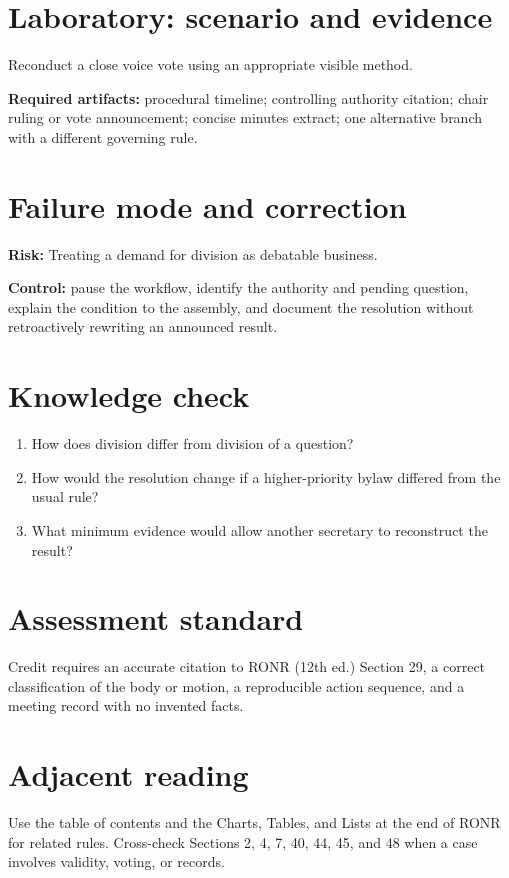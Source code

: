 \documentclass[11pt]{article}
\begin{document}
\section{Laboratory: scenario and evidence}
Reconduct a close voice vote using an appropriate visible method.

\textbf{Required artifacts:} procedural timeline; controlling authority citation; chair ruling or vote announcement; concise minutes extract; one alternative branch with a different governing rule.

\section{Failure mode and correction}
\textbf{Risk:} Treating a demand for division as debatable business.

\textbf{Control:} pause the workflow, identify the authority and pending question, explain the condition to the assembly, and document the resolution without retroactively rewriting an announced result.

\section{Knowledge check}
\begin{enumerate}[leftmargin=*,itemsep=4pt]
\item How does division differ from division of a question?
\item How would the resolution change if a higher-priority bylaw differed from the usual rule?
\item What minimum evidence would allow another secretary to reconstruct the result?
\end{enumerate}

\section{Assessment standard}
Credit requires an accurate citation to RONR (12th ed.) Section 29, a correct classification of the body or motion, a reproducible action sequence, and a meeting record with no invented facts.

\section{Adjacent reading}
Use the table of contents and the Charts, Tables, and Lists at the end of RONR for related rules. Cross-check Sections 2, 4, 7, 40, 44, 45, and 48 when a case involves validity, voting, or records.
\end{document}

